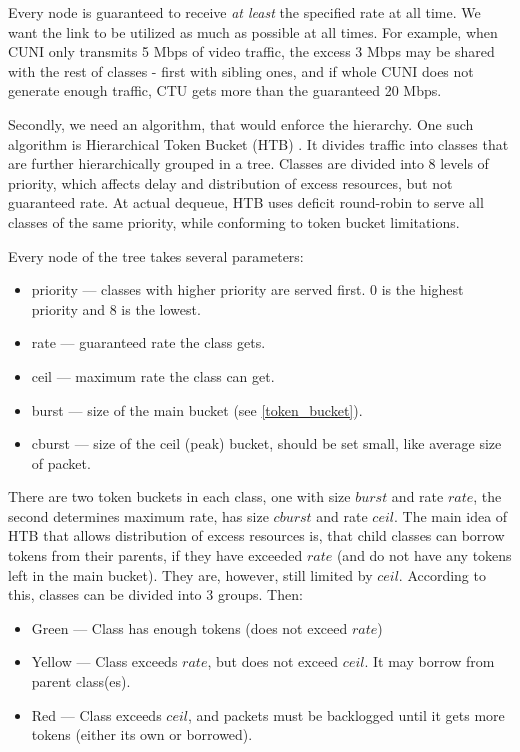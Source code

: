 Every node is guaranteed to receive \textit{at least} the specified rate at all time. We want the link to be utilized as much as possible at all times. For example, when CUNI only transmits 5 Mbps of video traffic, the excess 3 Mbps may be shared with the rest of classes - first with sibling ones, and if whole CUNI does not generate enough traffic, CTU gets more than the guaranteed 20 Mbps.


Secondly, we need an algorithm, that would enforce the hierarchy. One such algorithm is Hierarchical Token Bucket (HTB) \cite{HTB}. It divides traffic into classes that are further hierarchically grouped in a tree. Classes are divided into 8 levels of priority, which affects delay and distribution of excess resources, but not guaranteed rate. At actual dequeue, HTB uses deficit round-robin to serve all classes of the same priority, while conforming to token bucket limitations.

Every node of the tree takes several parameters:
\begin{itemize}
	\item priority --- classes with higher priority are served first. 0 is the highest priority and 8 is the lowest.
	\item rate --- guaranteed rate the class gets.
	\item ceil --- maximum rate the class can get.
	\item burst --- size of the main bucket (see \ref{token_bucket}).
	\item cburst --- size of the ceil (peak) bucket, should be set small, like average size of packet.
\end{itemize}

There are two token buckets in each class, one with size $burst$ and rate $rate$, the second determines maximum rate, has size $cburst$ and rate $ceil$. The main idea of HTB that allows distribution of excess resources is, that child classes can borrow tokens from their parents, if they have exceeded $rate$ (and do not have any tokens left in the main bucket). They are, however, still limited by $ceil$. According to this, classes can be divided into 3 groups. Then:
\begin{itemize}
	\item Green --- Class has enough tokens (does not exceed $rate$)
	\item Yellow --- Class exceeds $rate$, but does not exceed $ceil$. It may borrow from parent class(es).
	\item Red --- Class exceeds $ceil$, and packets must be backlogged until it gets more tokens (either its own or borrowed).
\end{itemize}


